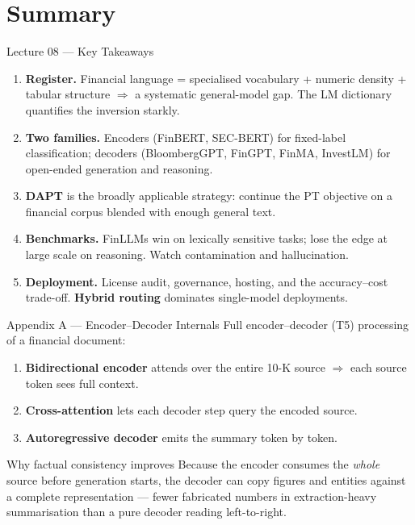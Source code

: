 \documentclass[9pt,t]{beamer}
\begin{document}
\section{Summary}

\begin{frame}{Lecture 08 --- Key Takeaways}
\begin{enumerate}
  \item \textbf{Register.} Financial language = specialised vocabulary + numeric
        density + tabular structure $\Rightarrow$ a systematic general-model gap.
        The LM dictionary quantifies the inversion starkly.
  \item \textbf{Two families.} Encoders (FinBERT, SEC-BERT) for fixed-label
        classification; decoders (BloombergGPT, FinGPT, FinMA, InvestLM) for
        open-ended generation and reasoning.
  \item \textbf{DAPT} is the broadly applicable strategy: continue the PT objective
        on a financial corpus blended with enough general text.
  \item \textbf{Benchmarks.} FinLLMs win on lexically sensitive tasks; lose the edge
        at large scale on reasoning. Watch contamination and hallucination.
  \item \textbf{Deployment.} License audit, governance, hosting, and the
        accuracy--cost trade-off. \textbf{Hybrid routing} dominates single-model
        deployments.
\end{enumerate}
\end{frame}


\begin{frame}[noframenumbering]{Appendix A --- Encoder--Decoder Internals}
Full encoder--decoder (T5) processing of a financial document:
\begin{enumerate}
  \item \textbf{Bidirectional encoder} attends over the entire 10-K source
        $\Rightarrow$ each source token sees full context.
  \item \textbf{Cross-attention} lets each decoder step query the encoded source.
  \item \textbf{Autoregressive decoder} emits the summary token by token.
\end{enumerate}

\medskip
\begin{block}{Why factual consistency improves}
Because the encoder consumes the \emph{whole} source before generation starts, the
decoder can copy figures and entities against a complete representation --- fewer
fabricated numbers in extraction-heavy summarisation than a pure decoder reading
left-to-right.
\end{block}
\end{frame}
\end{document}
